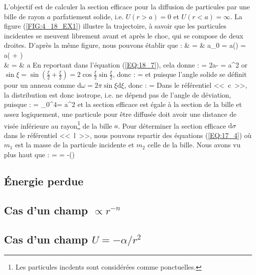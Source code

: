 L'objectif est de calculer la section efficace pour la diffusion de particules par une bille de rayon $a$ parfatiement solide, i.e. $U(r>a) = 0$ et $U(r<a) = \infty$. La figure (\ref{FIG:4_18_EX1}) illustre la trajectoire, \`a savoir que les particules incidentes se meuvent librement avant et apr\`es le choc, qui se compose de deux droites. D'apr\`es la m\^eme figure, nous pouvons \'etablir que :
\bea
	\rho & = & a\sin\varphi_{0} = a\sin\left(\right) = a\left(\cos{}\sin{} + \sin{}\cos{}\right) \nonumber \\
	& = & a\cos{}
\eea
En reportant dans l'\'equation (\ref{EQ:18_7}), cela donne :
\be
	\sigma = 2\pi a\cos{}\lvert -\sin{} \rvert {}\xi = \pi a^{2}\cos{}\sin{}\xi
\ee
or $\sin\xi = \sin(\frac{\xi}{2} + \frac{\xi}{2}) = 2\cos\frac{\xi}{2}\sin\frac{\xi}{2}$, donc :
\be
	\sigma = \sin\xi{}\xi
\ee
et puisque l'angle solide se d\'efinit pour un anneau comme $\mathrm{d}\omega = 2\pi\sin\xi\mathrm{d}\xi$, donc :
\be
	\sigma = \omega
\ee
Dans le r\'ef\'erentiel <<~c~>>, la distribution est donc isotrope, i.e. ne d\'epend pas de l'angle de d\'eviation, puisque :
\be
	\sigma = \int_{0}^{4\pi}\omega = \pi a^{2}
\ee
et la section efficace est \'egale \`a la section de la bille et assez logiquement, une particule pour \^etre diffus\'ee doit avoir une distance de vis\'ee inf\'erieure au rayon\footnote{Les particules incdents sont consid\'er\'ees comme ponctuelles.} de la bille $a$. Pour d\'eterminer la section efficace $\mathrm{d}\sigma$ dans le r\'ef\'erentiel <<~l~>>, nous pouvons repartir des \'equations (\ref{EQ:17_4}) o\`u $m_{1}$ est la masse de la particule incidente et $m_{2}$ celle de la bille. Nous avons vu plus haut que :
\be
	\sigma = \sin\xi{}\xi = -(\cos\xi)
\ee

\subsection{\'Energie perdue}

\subsection{Cas d'un champ $\propto r^{-n}$}

\subsection{Cas d'un champ $U = -\alpha / r^{2}$}

